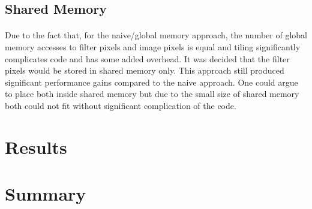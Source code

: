 \documentclass[10pt]{article}
\begin{document}
	\subsection{Shared Memory}
	
	\paragraph{} Due to the fact that, for the naive/global memory approach, the number of global memory accesses to filter pixels and image pixels is equal and tiling significantly complicates code and has some added overhead. It was decided that the filter pixels would be stored in shared memory only. This approach still produced significant performance gains compared to the naive approach. One could argue to place both inside shared memory but due to the small size of shared memory both could not fit without significant complication of the code. 
	
	
	\section{Results}
	
	\section{Summary}
	\newpage
	
	
	
\end{document}
